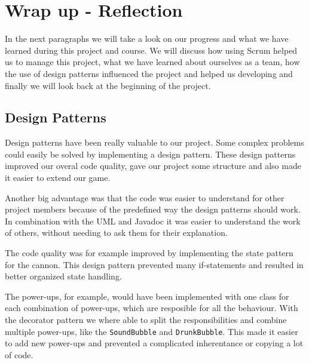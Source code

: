 \documentclass[a4paper]{article}
\begin{document}


\clearpage
\section{Wrap up - Reflection}

In the next paragraphs we will take a look on our progress and what we have learned during this project and course. We will discuss how using Scrum helped us to manage this project, what we have learned about ourselves as a team, how the use of design patterns influenced the project and helped us developing and finally we will look back at the beginning of the project.

\subsection{Design Patterns}
Design patterns have been really valuable to our project. Some complex problems could easily be solved by implementing a design pattern. These design patterns improved our overal code quality, gave our project some structure and also made it easier to extend our game.

Another big advantage was that the code was easier to understand for other project members because of the predefined way the design patterns should work. In combination with the UML and Javadoc it was easier to understand the work of others, without needing to ask them for their explanation.

The code quality was for example improved by implementing the state pattern for the cannon. This design pattern prevented many if-statements and resulted in better organized state handling.

The power-ups, for example, would have been implemented with one class for each combination of power-ups, which are resposible for all the behaviour. With the decorator pattern we where able to split the responsibilities and combine multiple power-ups, like the \texttt{SoundBubble} and \texttt{DrunkBubble}. This made it easier to add new power-ups and prevented a complicated inherentance or copying a lot of code.
\end{document}
